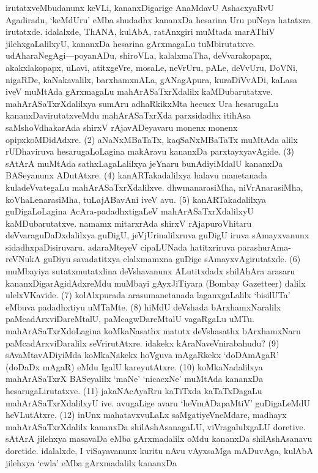 \documentclass[11pt,a4size]{article}
\begin{document}
irutatxveMbudanunx keVLi, kananxDigarige AnaMdavU AshacxyaRvU
Agadiradu, `keMdUru' eMba shudadhx kananxDa hesarina Uru puNeya
hatatxra irutatxde. idalalxde, ThANA, kulAbA, ratAnxgiri muMtada
marAThiV jilehxgaLalilxyU, kananxDa hesarina gArxmagaLu
tuMbirutatxve. udAharaNegAgi---poyanADu, shiroVLa, kalalxmaTha,
deVvarakopapx, akakxlakopapx, uLavi, atitxgeVre, mosaLe, neVrUru,
pALe, deVvUru, DoVNi, nigaRDe, kaNakavalilx, barxhamxnALa, gANagApura,
kuraDiVvADi, kaLasa iveV muMtAda gArxmagaLu mahArASaTxrXdalilx
kaMDubarutatxve. mahArASaTxrXdalilxya sumAru adhaRkikxMta hecucx Ura
hesarugaLu kananxDavirutatxveMdu mahArASaTxrXda parxsidadhx itihAsa
saMshoVdhakarAda shirxV rAjavADeyavaru monenx monenx
opipxkoMDidAdxre. (2) aNaNxMBaTaTx, kaqSaNxMBaTaTx muMtAda alilx
rUDhaviruva hesarugaLoLagina makAravu kananxDa parxtayxyavAgide. (3)
sAtArA muMtAda sathxLagaLalilxya jeYnaru bunAdiyiMdalU kananxDa
BASeyanunx ADutAtxre. (4) kanARTakadalilxya halavu manetanada
kuladeVvategaLu mahArASaTxrXdalilxve. dhwmanarasiMha, niVrAnarasiMha,
koVhaLenarasiMha, tuLajABavAni iveV avu. (5) kanARTakadalilxya
guDigaLoLagina AcAra-padadhxtigaLeV mahArASaTxrXdalilxyU
kaMDubarutatxve. namamx mitarxrAda shirxV rAjapuroVhitaru
deVvaraguDaDxdalilxya guDigU, jeVjUrinalilxruva guDigU iruva
sAmayxvanunx sidadhxpaDisiruvaru. adaraMteyeV cipaLUNada hatitxriruva
parashurAma-reVNukA guDiyu savadatitxya elalxmamxna guDige
sAmayxvAgirutatxde. (6) muMbayiya sutatxmutatxlina deVshavanunx
ALutitxdadx shilAhAra arasaru kananxDigarAgidAdxreMdu muMbayi
gAyxJiTiyara {\rm (Bombay Gazetteer)} dalilx
ulelxVKavide. (7) kolAlxpurada arasumanetanada laganxgaLalilx
`bisilUTa' eMbuva padadhxtiyu uMTaMte. (8) hiMdU deVshada
bArxhamxNaralilx paMcadArxviDareMtalU, paMcagwDareMtalU vagaRgaLu
uMTu. mahArASaTxrXdoLagina koMkaNasathx matutx deVshasathx
bArxhamxNaru paMcadArxviDaralilx seVrirutAtxre. idakekx
kAraNaveVnirabahudu? (9) sAvaMtavADiyiMda koMkaNakekx hoVguva
mAgaRkekx `doDAmAgaR' (doDaDx mAgaR) eMdu IgalU kareyutAtxre. (10)
koMkaNadalilxya mahArASaTxrX BASeyalilx `maNe' `nicacxNe' muMtAda
kananxDa hesarugaLirutatxve. (11) jakaNAcAyaRru kaTiTxda kaTaTxDagaLu
mahArASaTxrXdalilxyU ive. avugaLige avaru `heVmADapaMtiV' guDigaLeMdU
heVLutAtxre. (12) inUnx mahatavxvuLaLx saMgatiyeVneMdare, madhayx
mahArASaTxrXdalilx kananxDa shilAshAsanagaLU, viVragalulxgaLU
doretive. sAtArA jilehxya masavaDa eMba gArxmadalilx oMdu kananxDa
shilAshAsanavu doretide. idalalxde, I viSayavanunx kuritu nAvu
vAyxsaMga mADuvAga, kulAbA jilehxya `cwla' eMba gArxmadalilx kananxDa
\end{document}
